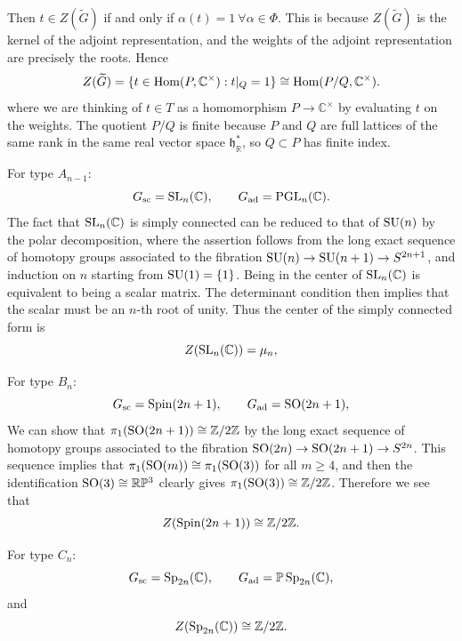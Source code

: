 \documentclass[12pt]{article}
\begin{document}
Then
$t\in Z(\widetilde G)$ if and only if $\alpha(t)=1\ \forall \alpha\in\Phi$. This is because $Z(\widetilde G)$ is the kernel of the adjoint representation, and the weights of the adjoint representation are precisely the roots. Hence
\[
    Z(\widetilde G)=\{t\in \operatorname{Hom}(P,\mathbb C^\times): t|_Q=1\}
    \cong \operatorname{Hom}(P/Q,\mathbb C^\times).
\]
where we are thinking of $t\in T$ as a homomorphism $P\to \mathbb C^\times$ by evaluating $t$ on the weights. The quotient $P/Q$ is finite because $P$ and $Q$ are full lattices of the same rank in the same real vector space $\mathfrak h_\mathbb R^*$, so $Q\subset P$ has finite index.


\begin{example}
    For type $A_{n-1}$:
    \[
        G_{\mathrm{sc}}=\operatorname{SL}_n(\mathbb C),
        \qquad
        G_{\mathrm{ad}}=\operatorname{PGL}_n(\mathbb C).
    \]
    The fact that $\operatorname{SL}_n(\mathbb C)$ is simply connected can be reduced to that of $\operatorname{SU}(n)$ by the polar decomposition, where the assertion follows from the long exact sequence of homotopy groups associated to the fibration $\operatorname{SU}(n)\to \operatorname{SU}(n+1)\to S^{2n+1}$, and induction on $n$ starting from $\operatorname{SU}(1)=\{1\}$.
    Being in the center of $\operatorname{SL}_n(\mathbb C)$ is equivalent to being a scalar matrix. The determinant condition then implies that the scalar must be an $n$-th root of unity. Thus the center of the simply connected form is
    \[
        Z(\operatorname{SL}_n(\mathbb C))=\mu_n,
    \]
\end{example}

\begin{example}
    For type $B_n$:
    \[
        G_{\mathrm{sc}}=\operatorname{Spin}(2n+1),
        \qquad
        G_{\mathrm{ad}}=\operatorname{SO}(2n+1),
    \]
    We can show that $\pi_1(\operatorname{SO}(2n+1))\cong \mathbb Z/2\mathbb Z$ by the long exact sequence of homotopy groups associated to the fibration $\operatorname{SO}(2n)\to \operatorname{SO}(2n+1)\to S^{2n}$. This sequence implies that $\pi_1(\operatorname{SO}(m)) \cong \pi_1(\operatorname{SO}(3))$ for all $m\geq 4$, and then the identification $\operatorname{SO}(3)\cong \mathbb{R}\mathbb{P}^3$ clearly gives $\pi_1(\operatorname{SO}(3))\cong \mathbb Z/2\mathbb Z$.
    Therefore we see that
    \[
        Z(\operatorname{Spin}(2n+1))\cong \mathbb Z/2\mathbb Z.
    \]
\end{example}

\begin{example}
    For type $C_n$:
    \[
        G_{\mathrm{sc}}=\operatorname{Sp}_{2n}(\mathbb C),
        \qquad
        G_{\mathrm{ad}}=\mathbb{P} \operatorname{Sp}_{2n}(\mathbb C),
    \]
    and
    \[
        Z(\operatorname{Sp}_{2n}(\mathbb C))\cong \mathbb Z/2\mathbb Z.
    \]
\end{example}
\end{document}
